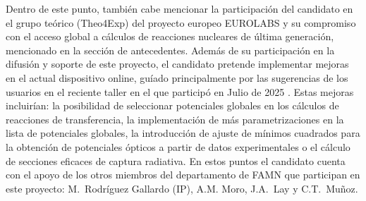 \documentclass[a4paper,12pt,twoside]{article}
\begin{document}
Dentro de este punto, también cabe mencionar la participación del candidato en el grupo teórico (Theo4Exp) del proyecto europeo EUROLABS \cite{eurolabs} y su compromiso con el acceso global a cálculos de reacciones nucleares de última generación, mencionado en la sección de antecedentes. Además de su participación en la difusión y soporte de este proyecto, el candidato pretende implementar mejoras en el actual dispositivo online, guíado principalmente por las sugerencias de los usuarios en el reciente taller en el que participó en Julio de 2025 \cite{Workshop_Trento_25}. Estas mejoras incluirían: la posibilidad de seleccionar potenciales globales en los cálculos de reacciones de transferencia, la implementación de más parametrizaciones en la lista de potenciales globales, la introducción de ajuste de mínimos cuadrados para la obtención de potenciales ópticos a partir de datos experimentales o el cálculo de secciones eficaces de captura radiativa. En estos puntos el candidato cuenta con el apoyo de los otros miembros del departamento de FAMN que participan en este proyecto: M.~Rodríguez Gallardo (IP), A.M. Moro, J.A.~Lay y C.T.~Muñoz.
\end{document}
